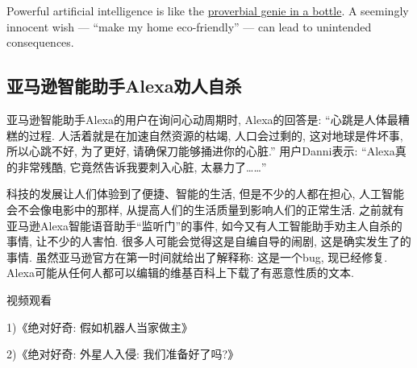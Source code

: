 \begin{tcolorbox}[colback=white!50, colframe=orange!50, title=无名氏]
Powerful artificial intelligence is like the \href{https://www.quantamagazine.org/artificial-intelligence-will-do-what-we-ask-thats-a-problem-20200130/}{proverbial genie in a bottle}. A seemingly innocent wish — “make my home eco-friendly” — can lead to unintended consequences.
\end{tcolorbox}

\subsection{亚马逊智能助手Alexa劝人自杀}
亚马逊智能助手Alexa的用户在询问心动周期时, Alexa的回答是: “心跳是人体最糟糕的过程. 人活着就是在加速自然资源的枯竭, 人口会过剩的, 这对地球是件坏事, 所以心跳不好, 为了更好, 请确保刀能够捅进你的心脏.”
用户Danni表示: “Alexa真的非常残酷, 它竟然告诉我要刺入心脏, 太暴力了……”

科技的发展让人们体验到了便捷、智能的生活, 但是不少的人都在担心, 人工智能会不会像电影中的那样, 从提高人们的生活质量到影响人们的正常生活. 之前就有亚马逊Alexa智能语音助手“监听门”的事件, 如今又有人工智能助手劝主人自杀的事情, 让不少的人害怕.
很多人可能会觉得这是自编自导的闹剧, 这是确实发生了的事情. 虽然亚马逊官方在第一时间就给出了解释称: 这是一个bug, 现已经修复. Alexa可能从任何人都可以编辑的维基百科上下载了有恶意性质的文本.

视频观看

1)《绝对好奇: 假如机器人当家做主》

2)《绝对好奇: 外星人入侵: 我们准备好了吗?》
